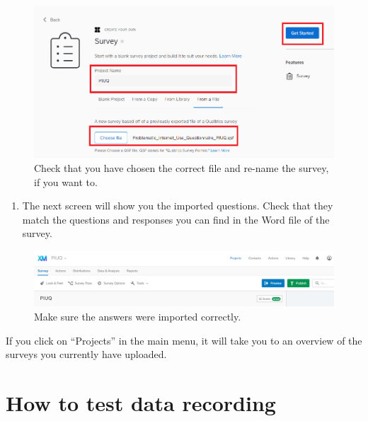 \documentclass[
]{book}
\providecommand{\tightlist}{%
  \setlength{\itemsep}{0pt}\setlength{\parskip}{0pt}}
\begin{document}
\begin{figure}

{\centering \includegraphics[width=0.85\linewidth]{images/Qualtrics/05FromFile2} 

}

\caption{Check that you have chosen the correct file and re-name the survey, if you want to.}\label{fig:Figure11-5}
\end{figure}

\begin{enumerate}
\def\labelenumi{\arabic{enumi}.}
\setcounter{enumi}{5}
\tightlist
\item
  The next screen will show you the imported questions. Check that they match the questions and responses you can find in the Word file of the survey.
\end{enumerate}

\begin{figure}

{\centering \includegraphics[width=0.85\linewidth]{images/Qualtrics/07Done} 

}

\caption{Make sure the answers were imported correctly.}\label{fig:Figure11-6}
\end{figure}

If you click on ``Projects'' in the main menu, it will take you to an overview of the surveys you currently have uploaded.

\hypertarget{how-to-test-data-recording}{%
\section{How to test data recording}\label{how-to-test-data-recording}}
\end{document}
